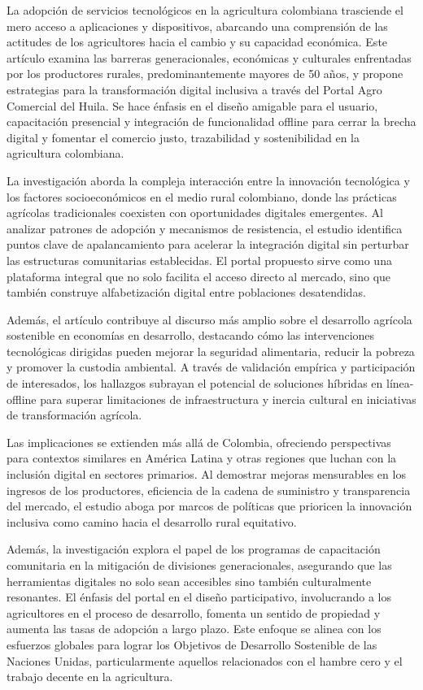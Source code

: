 La adopción de servicios tecnológicos en la agricultura colombiana trasciende el mero acceso a aplicaciones y dispositivos, abarcando una comprensión de las actitudes de los agricultores hacia el cambio y su capacidad económica. Este artículo examina las barreras generacionales, económicas y culturales enfrentadas por los productores rurales, predominantemente mayores de 50 años, y propone estrategias para la transformación digital inclusiva a través del Portal Agro Comercial del Huila. Se hace énfasis en el diseño amigable para el usuario, capacitación presencial y integración de funcionalidad offline para cerrar la brecha digital y fomentar el comercio justo, trazabilidad y sostenibilidad en la agricultura colombiana.

La investigación aborda la compleja interacción entre la innovación tecnológica y los factores socioeconómicos en el medio rural colombiano, donde las prácticas agrícolas tradicionales coexisten con oportunidades digitales emergentes. Al analizar patrones de adopción y mecanismos de resistencia, el estudio identifica puntos clave de apalancamiento para acelerar la integración digital sin perturbar las estructuras comunitarias establecidas. El portal propuesto sirve como una plataforma integral que no solo facilita el acceso directo al mercado, sino que también construye alfabetización digital entre poblaciones desatendidas.

Además, el artículo contribuye al discurso más amplio sobre el desarrollo agrícola sostenible en economías en desarrollo, destacando cómo las intervenciones tecnológicas dirigidas pueden mejorar la seguridad alimentaria, reducir la pobreza y promover la custodia ambiental. A través de validación empírica y participación de interesados, los hallazgos subrayan el potencial de soluciones híbridas en línea-offline para superar limitaciones de infraestructura y inercia cultural en iniciativas de transformación agrícola.

Las implicaciones se extienden más allá de Colombia, ofreciendo perspectivas para contextos similares en América Latina y otras regiones que luchan con la inclusión digital en sectores primarios. Al demostrar mejoras mensurables en los ingresos de los productores, eficiencia de la cadena de suministro y transparencia del mercado, el estudio aboga por marcos de políticas que prioricen la innovación inclusiva como camino hacia el desarrollo rural equitativo.

Además, la investigación explora el papel de los programas de capacitación comunitaria en la mitigación de divisiones generacionales, asegurando que las herramientas digitales no solo sean accesibles sino también culturalmente resonantes. El énfasis del portal en el diseño participativo, involucrando a los agricultores en el proceso de desarrollo, fomenta un sentido de propiedad y aumenta las tasas de adopción a largo plazo. Este enfoque se alinea con los esfuerzos globales para lograr los Objetivos de Desarrollo Sostenible de las Naciones Unidas, particularmente aquellos relacionados con el hambre cero y el trabajo decente en la agricultura.

